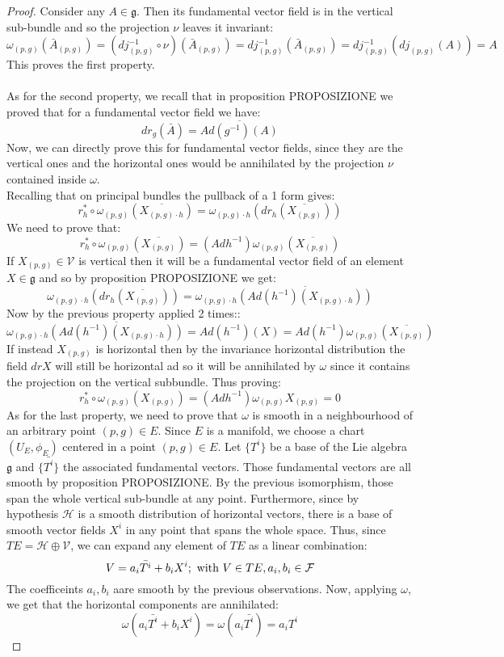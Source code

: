 \documentclass[12pt,a4paper]{report}
\theoremstyle{definition}
\theoremstyle{Theorem}
\theoremstyle{definition}
\theoremstyle{definition}
\theoremstyle{definition}
\begin{document}
		\begin{proof}
			Consider any $A\in\mathfrak{g}$. Then its fundamental vector field is in the vertical sub-bundle and so the projection $\nu$ leaves it invariant:
			$$\omega_{(p,g)}(\bar{A}_{(p,g)})=(dj_{(p,g)}^{-1}\circ \nu)(\bar{A}_{(p,g)})=dj_{(p,g)}^{-1}(\bar{A}_{(p,g)})=
			dj_{(p,g)}^{-1}(dj_{(p,g)}(A))=A$$
			This proves the first property.\\
			\\
			As for the second property, we recall that in proposition PROPOSIZIONE we proved that for a fundamental vector field  we have:
			$$dr_g(\bar{A})=\overline{Ad(g^{-1})(A)}$$
			Now, we can directly prove this for fundamental vector fields, since they are the vertical ones and the horizontal ones would be annihilated by the projection $\nu$ contained inside $\omega$. \\
			Recalling that on principal bundles the pullback of a 1 form gives:
			$$r^*_h\circ \omega_{(p,g)}(\overline{X_{(p,g)\cdot h}})=\omega_{(p,g)\cdot h}(dr_h(\overline{X_{(p,g)}}))$$
			We need to prove that:
			$$r^*_h\circ \omega_{(p,g)}(\overline{X_{(p,g)}})=(Adh^{-1})\omega_{(p,g)}(\overline{X_{(p,g)}})$$
			If $X_{(p,g)}\in\mathcal{V}$ is vertical then it will be a fundamental vector field of an element $X\in\mathfrak{g}$ and so by proposition PROPOSIZIONE we get:
			$$\omega_{(p,g)\cdot h}(dr_h(\overline{X_{(p,g)}}))=\omega_{(p,g)\cdot h}\overline{(Ad(h^{-1})(X_{(p,g)\cdot h}))}$$
			Now by the previous property applied 2 times::
			$$\omega_{(p,g)\cdot h}\overline{(Ad(h^{-1})(X_{(p,g)\cdot h}))}=Ad(h^{-1})(X)=Ad(h^{-1})\omega_{(p,g)}(\overline{X_{(p,g)}})$$
			If instead $X_{(p,g)}$ is horizontal then by the invariance horizontal distribution the field $dr X$ will still be horizontal ad so it will be annihilated by $\omega$ since it contains the projection on the vertical subbundle. Thus proving:
			$$r^*_h\circ \omega_{(p,g)}(X_{(p,g)})=(Adh^{-1})\omega_{(p,g)}X_{(p,g)}=0$$
			As for the last property, we need to prove that $\omega$ is smooth in a neighbourhood of an arbitrary point $(p,g)\in E$. Since $E$ is a manifold, we choose a chart $(U_E,\phi_E)$ centered in a point $(p,g)\in E$. Let $\{T^i\}$ be a base of the Lie algebra $\mathfrak{g}$ and $\{\bar{T^i}\}$ the associated fundamental vectors. Those fundamental vectors are all smooth by proposition PROPOSIZIONE. By the previous isomorphism, those span the whole vertical sub-bundle at any point. Furthermore, since by hypothesis $\mathcal{H}$ is a smooth distribution  of horizontal vectors, there is a base of smooth vector fields $X^i$ in any point that spans the whole space. Thus, since $TE=\mathcal{H}\oplus\mathcal{V}$, we can expand any element of $TE$ as a linear combination:
			$$V=a_i \bar{T^i}+b_iX^i;\hbox{ with } V\in TE, a_i,b_i\in \mathcal{F}$$
			The coefficeints $a_i,b_i$ aare smooth by the previous observations. Now, applying $\omega$, we get that the horizontal components are annihilated:
			$$\omega(a_i \bar{T^i}+b_iX^i)=\omega(a_i \bar{T^i})=a_i T^i$$
		\end{proof}
\end{document}
